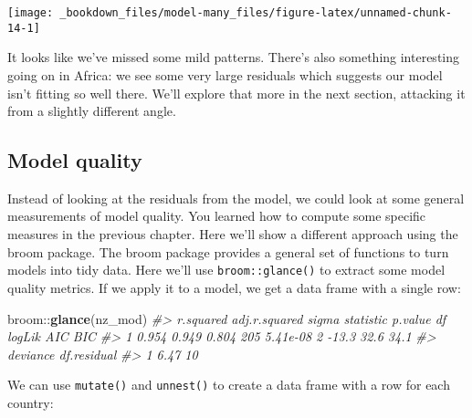 \documentclass[]{book}
\newenvironment{Shaded}{\begin{snugshade}}{\end{snugshade}}
\newcommand{\KeywordTok}[1]{\textcolor[rgb]{0.13,0.29,0.53}{\textbf{{#1}}}}
\newcommand{\CommentTok}[1]{\textcolor[rgb]{0.56,0.35,0.01}{\textit{{#1}}}}
\newcommand{\NormalTok}[1]{{#1}}
\begin{document}
\begin{center}\texttt{[image: \_bookdown\_files/model-many\_files/figure-latex/unnamed-chunk-14-1]} \end{center}

It looks like we've missed some mild patterns. There's also something
interesting going on in Africa: we see some very large residuals which
suggests our model isn't fitting so well there. We'll explore that more
in the next section, attacking it from a slightly different angle.

\subsection{Model quality}\label{model-quality}

Instead of looking at the residuals from the model, we could look at
some general measurements of model quality. You learned how to compute
some specific measures in the previous chapter. Here we'll show a
different approach using the broom package. The broom package provides a
general set of functions to turn models into tidy data. Here we'll use
\texttt{broom::glance()} to extract some model quality metrics. If we
apply it to a model, we get a data frame with a single row:

\begin{Shaded}
\begin{Highlighting}[]
\NormalTok{broom::}\KeywordTok{glance}\NormalTok{(nz_mod)}
\CommentTok{#>   r.squared adj.r.squared sigma statistic  p.value df logLik  AIC  BIC}
\CommentTok{#> 1     0.954         0.949 0.804       205 5.41e-08  2  -13.3 32.6 34.1}
\CommentTok{#>   deviance df.residual}
\CommentTok{#> 1     6.47          10}
\end{Highlighting}
\end{Shaded}

We can use \texttt{mutate()} and \texttt{unnest()} to create a data
frame with a row for each country:
\end{document}

